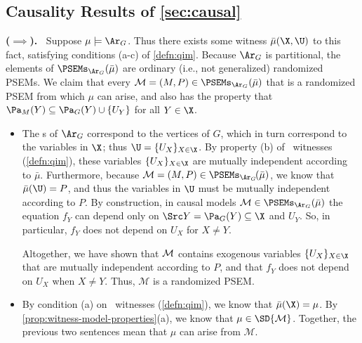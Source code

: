 \begin{subappendices}
\subsection{Causality Results of \cref{sec:causal}}
\begin{lproof}\label{proof:sc-graph-arise}
    \textbf{($\implies$).~} Suppose $\mu \models \Ar_G$. 
    Thus there exists some witness $\bar\mu(\X,\U)$ to this fact, satisfying conditions (a-c) of \cref{defn:qim}. 
    Because $\Ar_G$ is partitional, the elements
    of $\PSEMs_{\Ar_G}(\bar\mu)$ are ordinary (i.e., not generalized) randomized PSEMs.
    We claim that every $\mathcal M = (M,P) \in \PSEMs_{\Ar_G}(\bar\mu)$ that is a randomized PSEM from which $\mu$ can arise,
    and also has the property that $\Pa_M(Y) \subseteq \Pa_G(Y) \cup \{U_Y\}$ for all $Y \in \X$. 
    \begin{itemize}[left=1em]
    \item 
    The \hyperarc s of $\Ar_G$ correspond to the vertices of $G$, which in turn correspond to the variables in $\X$; thus $\U = \{ U_X \}_{X \in \X}$. 
    By property (b) of \scibility\ witnesses (\cref{defn:qim}), these variables $\{ U_X \}_{X \in \X}$ are mutually independent according to $\bar\mu$. 
    Furthermore, because $\mathcal M = (M, P) \in \PSEMs_{\Ar_{G}\!}(\bar\mu)$, we know that $\bar\mu(\U) = P$, 
    and thus the variables in $\U$ must be mutually independent according to $P$.
    By construction, in causal models $\mathcal M \in \PSEMs_{\Ar_G}(\bar\mu)$ the equation $f_Y$ can depend only on $\Src Y = \Pa_G(Y) \subseteq \X$ and $U_Y$. So, in particular, $f_Y$ does not depend on $U_X$ for $X \ne Y$.
    
    Altogether, we have shown that ${\cal M}$ contains exogenous variables $\{ U_X \}_{X \in \X}$ that are mutually independent according to $P$, and that $f_Y$ does not depend on $U_X$ when $X \ne Y$. 
    Thus, $\mathcal M$ is a randomized PSEM.

    \item 
    By condition (a) on \scibility\ witnesses (\cref{defn:qim}), we know that $\bar\mu(\X) = \mu$. By \cref{prop:witness-model-properties}(a), we know that $\mu \in \SD{\cal M}$. 
    Together, the previous two sentences mean that $\mu$ can arise from $\mathcal M$.
    

\end{itemize}
\end{lproof}
\end{subappendices}
